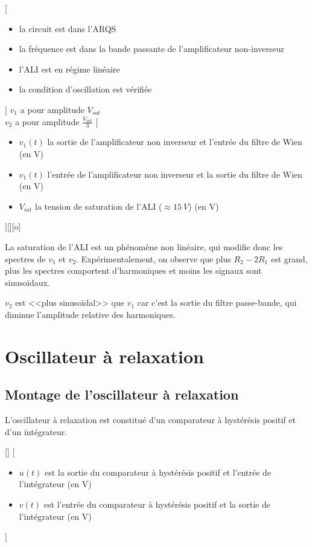 [
  \begin{itemize}
    \item la circuit est dans l'ARQS
    \item la fréquence est dans la bande passante de l'amplificateur non-inverseur
    \item l'ALI est en régime linéaire
    \item la condition d'oscillation est vérifiée
  \end{itemize}
]
{$v_1$ a pour amplitude $V_{sat}$\\$v_2$ a pour amplitude $\frac{V_{sat}}{3}$}
[
  \begin{itemize}
    \item $v_1(t)$ la sortie de l'amplificateur non inverseur et l'entrée du filtre de Wien (en \unit{V})
    \item $v_1(t)$ l'entrée de l'amplificateur non inverseur et la sortie du filtre de Wien (en \unit{V})
    \item $V_\text{sat}$ la tension de saturation de l'ALI ($\approx\SI{15}{V}$) (en \unit{V})
  \end{itemize}
][][o]

La saturation de l'ALI est un phénomène non linéaire, qui modifie donc les spectres de $v_1$ et $v_2$. Expérimentalement, on observe que plus $R_2-2R_1$ est grand, plus les spectres comportent d'harmoniques et moins les signaux sont sinusoïdaux.

$v_2$ est <<plus sinusoïdal>> que $v_1$ car c'est la sortie du filtre passe-bande, qui diminue l'amplitude relative des harmoniques.


\section{Oscillateur à relaxation}
\subsection{Montage de l'oscillateur à relaxation}
L'oscillateur à relaxation est constitué d'un comparateur à hystérésis positif et d'un intégrateur.

[]{\schema{}{5cm}}
[
  \begin{itemize}
    \item $u(t)$ est la sortie du comparateur à hystérésis positif et l'entrée de l'intégrateur (en \unit{V})
    \item $v(t)$ est l'entrée du comparateur à hystérésis positif et la sortie de l'intégrateur (en \unit{V})
  \end{itemize}
]


